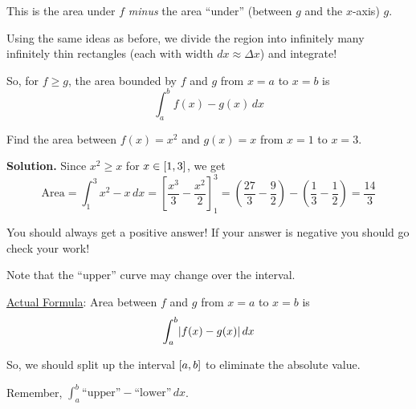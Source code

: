 This is the area under $ f $ \emph{minus} the area ``under'' (between $ g $ and the
$ x $-axis) $ g $.

Using the same ideas as before, we divide the region into infinitely many infinitely thin
rectangles (each with width $ dx\approx \Delta x $) and integrate!

So, for $ f\geqslant g $, the area bounded by $ f $ and $ g $ from
$ x=a $ to $ x=b $ is
\[ \int_{a}^{b} f(x)-g(x)\, d{x} \]

\begin{Example}{}{}
    Find the area between $ f(x)=x^2 $ and $ g(x)=x $ from $ x=1 $ to $ x=3 $.

    \textbf{Solution.} Since $ x^2\geqslant x $ for $ x\in\interval{1}{3} $, we get
    \[ \text{Area}=\int_{1}^{3} x^2-x\, d{x} =
        \left[ \frac{x^3}{3} -\frac{x^2}{2} \right]_1^3
        =\left( \frac{27}{3} -\frac{9}{2}  \right)-\left( \frac{1}{3}-\frac{1}{2}  \right)
        =\frac{14}{3} \]
\end{Example}

\begin{Remark}{}{}
    You should always get a positive answer! If your answer is negative you should go check
    your work!

    Note that the ``upper'' curve may change over the interval.
\end{Remark}

\underline{Actual Formula}: Area between $ f $ and $ g $ from $ x=a $ to $ x=b $ is
\[ \int_{a}^{b} \lvert f(x)-g(x)\rvert\, d{x}  \]

So, we should split up the interval $ \interval{a}{b} $ to eliminate
the absolute value.

Remember, $ \displaystyle \int_{a}^{b} \text{``upper''}-\text{``lower''}\, d{x} $.


